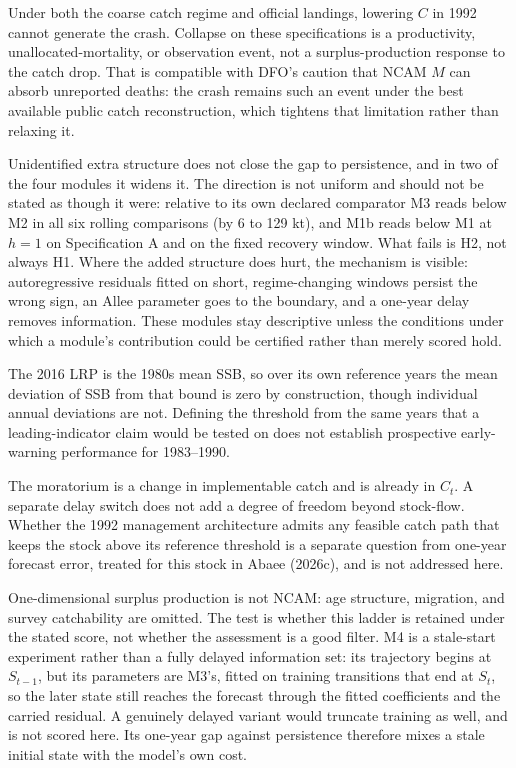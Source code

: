 \documentclass[11pt]{article}
\begin{document}
Under both the coarse catch regime and official landings, lowering \(C\)
in 1992 cannot generate the crash. Collapse on these specifications is a
productivity, unallocated-mortality, or observation event, not a
surplus-production response to the catch drop. That is
compatible with DFO's caution that NCAM \(M\) can absorb unreported
deaths: the crash remains such an event under the best available public
catch reconstruction, which tightens that limitation rather than
relaxing it.

Unidentified extra structure does not close the gap to persistence, and
in two of the four modules it widens it. The direction is not uniform
and should not be stated as though it were: relative to its own declared
comparator M3 reads below M2 in all six rolling comparisons (by 6 to 129
kt), and M1b reads below M1 at \(h=1\) on Specification A and on the
fixed recovery window. What fails is H2, not always H1. Where the added
structure does hurt, the mechanism is visible: autoregressive residuals
fitted on short, regime-changing windows persist the wrong sign, an
Allee parameter goes to the boundary, and a one-year delay removes
information. These modules stay descriptive unless the conditions under
which a module's contribution could be certified rather than merely
scored hold.

The 2016 LRP is the 1980s mean SSB, so over its own reference years the
mean deviation of SSB from that bound is zero by construction, though
individual annual deviations are not. Defining the threshold from the
same years that a leading-indicator claim would be tested on does not
establish prospective early-warning performance for 1983--1990.

The moratorium is a change in implementable catch and is already in
\(C_t\). A separate delay switch does not add a degree of freedom beyond
stock-flow. Whether the 1992 management architecture admits any feasible
catch path that keeps the stock above its reference threshold is a
separate question from one-year forecast error, treated for this stock
in Abaee (2026c), and is not addressed
here.

One-dimensional surplus production is not NCAM: age structure,
migration, and survey catchability are omitted. The test is whether this
ladder is retained under the stated score, not whether the assessment is
a good filter. M4 is a stale-start experiment rather than a fully delayed information
set: its trajectory begins at \(S_{t-1}\), but its parameters are
M3's, fitted on training transitions that end at \(S_t\), so the
later state still reaches the forecast through the fitted coefficients
and the carried residual. A genuinely delayed variant would truncate
training as well, and is not scored here. Its one-year gap against
persistence therefore mixes a stale initial state with the model's own
cost.
\end{document}
